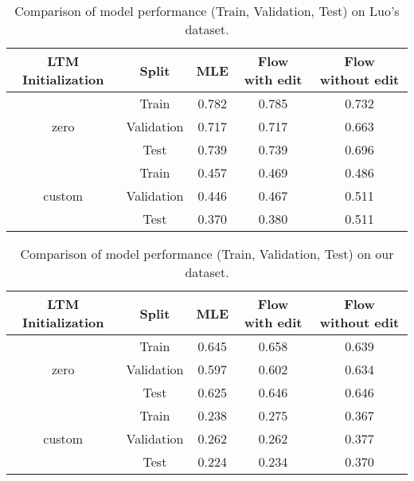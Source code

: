 \begin{table}[h!]
\centering
\begin{tabular}{|c|c|c|c|c|}
\hline
\textbf{LTM Initialization} & \textbf{Split} & \textbf{MLE} & \textbf{Flow with edit} & \textbf{Flow without edit} \\
\hline
\multirow{3}{*}{zero} 
& Train& 0.782 & 0.785 & 0.732 \\
& Validation & 0.717 & 0.717 & 0.663 \\
& Test & 0.739 & 0.739 & 0.696 \\
\hline
\multirow{3}{*}{custom} 
& Train& 0.457 & 0.469 & 0.486 \\
& Validation & 0.446 & 0.467 & 0.511 \\
& Test & 0.370 & 0.380 & 0.511 \\
\hline
\end{tabular}
\caption{Comparison of model performance (Train, Validation, Test) on Luo's dataset.}
\end{table}

\begin{table}[h!]
\centering
\begin{tabular}{|c|c|c|c|c|}
\hline
\textbf{LTM Initialization} & \textbf{Split} & \textbf{MLE} & \textbf{Flow with edit} & \textbf{Flow without edit} \\
\hline
\multirow{3}{*}{zero} 
& Train& 0.645 & 0.658 & 0.639 \\
& Validation & 0.597 & 0.602 & 0.634 \\
& Test & 0.625 & 0.646 & 0.646 \\
\hline
\multirow{3}{*}{custom} 
& Train& 0.238 & 0.275 & 0.367 \\
& Validation & 0.262 & 0.262 & 0.377 \\
& Test & 0.224 & 0.234 & 0.370 \\
\hline
\end{tabular}
\caption{Comparison of model performance (Train, Validation, Test) on our dataset.}
\end{table}

